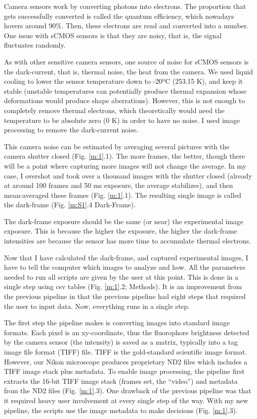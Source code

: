 Camera sensors work by converting photons into electrons. The proportion that gets successfully converted is called the quantum efficiency, which nowadays hovers around 90\%. Then, these electrons are read and converted into a number. One issue with sCMOS sensors is that they are noisy, that is, the signal fluctuates randomly. 

As with other sensitive camera sensors, one source of noise for sCMOS sensors is the dark-current, that is, thermal noise, the heat from the camera. We used liquid cooling to lower the sensor temperature down to -20ºC (253.15 K), and keep it stable (unstable temperatures can potentially produce thermal expansion whose deformations would produce shape aberrations). However, this is not enough to completely remove thermal electrons, which theoretically would need the temperature to be absolute zero (0 K) in order to have no noise. I used image processing to remove the dark-current noise.

This camera noise can be estimated by averaging several pictures with the camera shutter closed (Fig. \ref{m:1}.1). The more frames, the better, though there will be a point where capturing more images will not change the average. In my case, I overshot and took over a thousand images with the shutter closed (already at around 100 frames and 50 ms exposure, the average stabilizes), and then mean-averaged these frames (Fig. \ref{m:1}.1). The resulting single image is called the dark-frame (Fig. \ref{m:S1}.4 Dark-Frame).

The dark-frame exposure should be the same (or near) the experimental image exposure. This is because the higher the exposure, the higher the dark-frame intensities are because the sensor has more time to accumulate thermal electrons.

Now that I have calculated the dark-frame, and captured experimental images, I have to tell the computer which images to analyze and how. All the parameters needed to run all scripts are given by the user at this point. This is done in a single step using csv tables (Fig. \ref{m:1}.2; Methods). It is an improvement from the previous pipeline in that the previous pipeline had eight steps that required the user to input data. Now, everything runs in a single step.

The first step the pipeline makes is converting images into standard image formats. Each pixel is an xy-coordinate, thus the fluorophore brightness detected by the camera sensor (the intensity) is saved as a matrix, typically into a tag image file format (TIFF) file. TIFF is the gold-standard scientific image format. However, our Nikon microscope produces proprietary ND2 files which includes a TIFF image stack plus metadata. To enable image processing, the pipeline first extracts the 16-bit TIFF image stack (frames set, the “video”) and metadata from the ND2 files (Fig. \ref{m:1}.3). One drawback of the previous pipeline was that it required heavy user involvement at every single step of the way. With my new pipeline, the scripts use the image metadata to make decisions (Fig. \ref{m:1}.3). 

